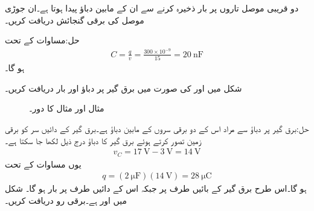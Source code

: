 
دو  قریبی موصل تاروں پر  بار ذخیرہ کرنے سے ان کے مابین  دباؤ پیدا ہوتا ہے۔ان جوڑی موصل کی برقی گنجائش دریافت کریں۔

حل:مساوات  کے تحت
\begin{align*}
C=\frac{q}{v}=\frac{300 \times 10^{-9}}{15}=\SI{20}{\nano\farad}
\end{align*}
ہو گا۔ 

\FloatBarrier
شکل  میں  اور  کی صورت میں برق گیر پر دباؤ اور بار دریافت کریں۔
\begin{figure}
\centering
{}
\caption{مثال  اور مثال  کا دور۔}
\label{شکل_مثال_امالہ_برق_گیر_دباو_رو_تعلق_الف}
\end{figure}

حل:برق گیر پر دباؤ سے مراد اس کے دو برقی سروں کے مابین دباؤ ہے۔برق گیر کے دائیں سر کو برقی زمین تصور کرتے ہوئے  برق گیر کا دباؤ درج ذیل لکھا جا سکتا ہے۔
\begin{align*}
v_C=\SI{17}{\volt}-\SI{3}{\volt}=\SI{14}{\volt}
\end{align*}
یوں مساوات  کے تحت
\begin{align*}
q=\left(\SI{2}{\micro\farad}\right)\left(\SI{14}{\volt}\right)=\SI{28}{\micro\coulomb}
\end{align*}
ہو گا۔اس طرح برق گیر کے بائیں طرف پر  جبکہ اس کے دائیں طرف پر  بار ہو گا۔
شکل  میں  اور  ہے۔برقی رو دریافت کریں۔

